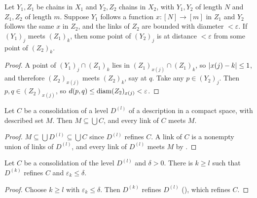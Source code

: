 
\begin{lemma}[Matching]\label{lem:pattern-matching}
Let $Y_1,Z_1$ be chains in $X_1$ and $Y_2,Z_2$ chains in $X_2$, with $Y_1,Y_2$ of length $N$ and $Z_1,Z_2$ of length $m$. Suppose $Y_1$
follows a function $x\colon[N]\to[m]$ in $Z_1$ and $Y_2$ follows the same $x$ in $Z_2$, and the links of $Z_2$ are bounded with
diameter $<\varepsilon$. If $(Y_1)_j$ meets $(Z_1)_k$, then some point of $(Y_2)_j$ is at distance $<\varepsilon$ from some point of
$(Z_2)_k$.
\end{lemma}

\begin{proof}
A point of $(Y_1)_j\cap(Z_1)_k$ lies in $(Z_1)_{x(j)}\cap(Z_1)_k$, so $\left\lvert x(j)-k\right\rvert\le1$, and therefore $(Z_2)_{x(j)}$ meets $(Z_2)_k$,
say at $q$. Take any $p\in(Y_2)_j$. Then $p,q\in(Z_2)_{x(j)}$, so $d(p,q)\le\operatorname{diam}(Z_2)_{x(j)}<\varepsilon$.
\end{proof}


\begin{lemma}\label{lem:consolidation-meets}
Let $C$ be a consolidation of a level $D^{(l)}$ of a description in a compact space, with described set $M$. Then
$M\subseteq\bigcup C$, and every link of $C$ meets $M$.
\end{lemma}

\begin{proof}
$M\subseteq\bigcup D^{(l)}\subseteq\bigcup C$ since $D^{(l)}$ refines $C$. A link of $C$ is a nonempty union of links of $D^{(l)}$, and
every link of $D^{(l)}$ meets $M$ by .
\end{proof}


\begin{lemma}\label{lem:level-refining}
Let $C$ be a consolidation of the level $D^{(l)}$ and $\delta>0$. There is $k\ge l$ such that $D^{(k)}$ refines $C$ and
$\varepsilon_k\le\delta$.
\end{lemma}

\begin{proof}
Choose $k\ge l$ with $\varepsilon_k\le\delta$. Then $D^{(k)}$ refines $D^{(l)}$ (), which refines $C$.
\end{proof}

